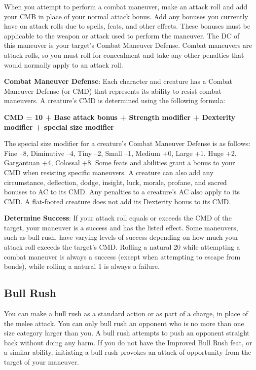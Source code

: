 When you attempt to perform a combat maneuver, make an attack roll and add your CMB in place of your normal attack bonus. Add any bonuses you currently have on attack rolls due to spells, feats, and other effects. These bonuses must be applicable to the weapon or attack used to perform the maneuver. The DC of this maneuver is your target's Combat Maneuver Defense. Combat maneuvers are attack rolls, so you must roll for concealment and take any other penalties that would normally apply to an attack roll.
				
\textbf{Combat Maneuver Defense}: Each character and creature has a Combat Maneuver Defense (or CMD) that represents its ability to resist combat maneuvers. A creature's CMD is determined using the following formula:

{\large \textbf{CMD = 10 + Base attack bonus + Strength modifier + Dexterity modifier + special size modifier}}
				
The special size modifier for a creature's Combat Maneuver Defense is as follows: Fine --8, Diminutive --4, Tiny --2, Small --1, Medium +0, Large +1, Huge +2, Gargantuan +4, Colossal +8. Some feats and abilities grant a bonus to your CMD when resisting specific maneuvers. A creature can also add any circumstance, deflection, dodge, insight, luck, morale, profane, and sacred bonuses to AC to its CMD. Any penalties to a creature's AC also apply to its CMD. A flat-footed creature does not add its Dexterity bonus to its CMD.
				
\textbf{Determine Success}: If your attack roll equals or exceeds the CMD of the target, your maneuver is a success and has the listed effect. Some maneuvers, such as bull rush, have varying levels of success depending on how much your attack roll exceeds the target's CMD. Rolling a natural 20 while attempting a combat maneuver is always a success (except when attempting to escape from bonds), while rolling a natural 1 is always a failure.
				
\subsection{Bull Rush}

				
You can make a bull rush as a standard action or as part of a charge, in place of the melee attack. You can only bull rush an opponent who is no more than one size category larger than you. A bull rush attempts to push an opponent straight back without doing any harm. If you do not have the Improved Bull Rush feat, or a similar ability, initiating a bull rush provokes an attack of opportunity from the target of your maneuver.
				
